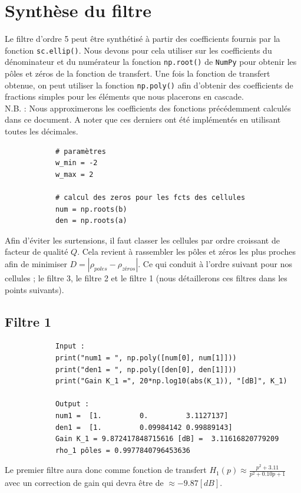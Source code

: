 \documentclass[a4paper,12pt,oneside]{report}	%
\begin{document}
    \section{Synthèse du filtre}
        Le filtre d'ordre 5 peut être synthétisé à partir des coefficients fournis par la fonction \texttt{sc.ellip()}. Nous devons pour cela utiliser sur les coefficients du dénominateur et du numérateur la fonction \texttt{np.root()} de \texttt{NumPy} pour obtenir les pôles et zéros de la fonction de transfert. Une fois la fonction de transfert obtenue, on peut utiliser la fonction \texttt{np.poly()} afin d'obtenir des coefficients de fractions simples pour les éléments que nous placerons en cascade. \\
        N.B. : Nous approximerons les coefficients des fonctions précédemment calculés dans ce document. A noter que ces derniers ont été implémentés en utilisant toutes les décimales.
        \begin{verbatim}
            # paramètres
            w_min = -2
            w_max = 2

            # calcul des zeros pour les fcts des cellules
            num = np.roots(b)
            den = np.roots(a)
        \end{verbatim}  
        \quad{}Afin d'éviter les surtensions, il faut classer les cellules par ordre croissant de facteur de qualité $Q$. Cela revient à rassembler les pôles et zéros les plus proches afin de minimiser $D = |\rho_{poles} - \rho_{zéros}|$. Ce qui conduit à l’ordre suivant pour nos cellules ; le filtre 3, le filtre 2 et le filtre 1 (nous détaillerons ces filtres dans les points suivants).
        \subsection{Filtre 1}
            \begin{verbatim}
            Input :
            print("num1 = ", np.poly([num[0], num[1]]))
            print("den1 = ", np.poly([den[0], den[1]]))
            print("Gain K_1 =", 20*np.log10(abs(K_1)), "[dB]", K_1)

            Output :
            num1 =  [1.         0.         3.1127137]
            den1 =  [1.         0.09984142 0.99889143]
            Gain K_1 = 9.872417848715616 [dB] =  3.11616820779209
            rho_1 pôles = 0.9977840796453636
            \end{verbatim}
            Le premier filtre aura donc comme fonction de transfert $H_1(p) \approx \frac{p^2 + 3.11}{p^2 + 0.10p + 1}$ avec un correction de gain qui devra être de $\approx -9.87 [dB]$.
\end{document}
